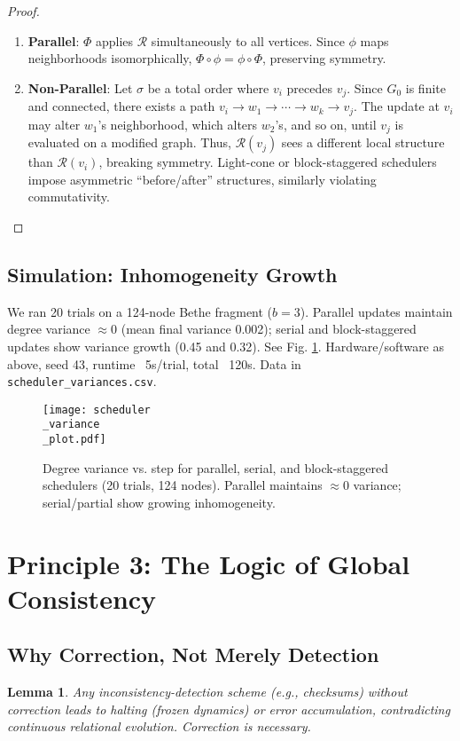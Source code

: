 \documentclass[11pt, a4paper]{article}
\newtheorem{lemma}{Lemma}[section]
\begin{document}
\begin{proof}
\begin{enumerate}
  \item \textbf{Parallel}: $\Phi$ applies $\mathcal{R}$ simultaneously to all vertices. Since $\phi$ maps neighborhoods isomorphically, $\Phi \circ \phi = \phi \circ \Phi$, preserving symmetry.
  \item \textbf{Non-Parallel}: Let $\sigma$ be a total order where $v_i$ precedes $v_j$. Since $G_0$ is finite and connected, there exists a path $v_i \to w_1 \to \cdots \to w_k \to v_j$. The update at $v_i$ may alter $w_1$’s neighborhood, which alters $w_2$’s, and so on, until $v_j$ is evaluated on a modified graph. Thus, $\mathcal{R}(v_j)$ sees a different local structure than $\mathcal{R}(v_i)$, breaking symmetry. Light-cone or block-staggered schedulers impose asymmetric “before/after” structures, similarly violating commutativity.
\end{enumerate}
\end{proof}

\subsection{Simulation: Inhomogeneity Growth}
We ran 20 trials on a 124-node Bethe fragment ($b=3$). Parallel updates maintain degree variance $\approx 0$ (mean final variance 0.002); serial and block-staggered updates show variance growth (0.45 and 0.32). See Fig. \ref{fig:symmetry}. Hardware/software as above, seed 43, runtime ~5s/trial, total ~120s. Data in \texttt{scheduler\_variances.csv}.

\begin{figure}[h!]
  \centering
  \texttt{[image: scheduler\\\_variance\\\_plot.pdf]} %
  \caption{Degree variance vs. step for parallel, serial, and block-staggered schedulers (20 trials, 124 nodes). Parallel maintains $\approx 0$ variance; serial/partial show growing inhomogeneity.}
  \label{fig:symmetry}
\end{figure}

\section{Principle 3: The Logic of Global Consistency}

\subsection{Why Correction, Not Merely Detection}
\begin{lemma}
\label{lem:correction_needed}
Any inconsistency-detection scheme (e.g., checksums) without correction leads to halting (frozen dynamics) or error accumulation, contradicting continuous relational evolution. Correction is necessary.
\end{lemma}
\end{document}
